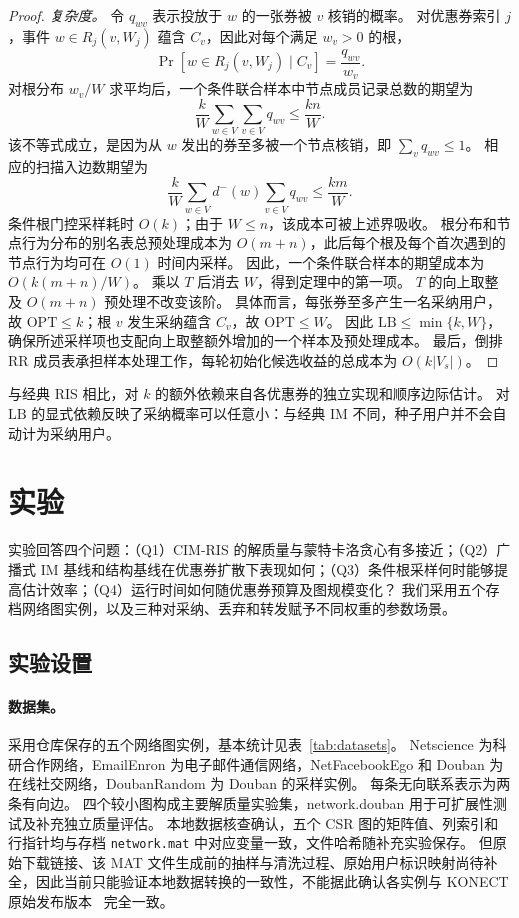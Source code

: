 \documentclass[sigconf,balance=false]{acmart}
\newcommand{\CIMRIS}{\textsc{CIM-RIS}}
\begin{document}
\begin{proof}
\textit{复杂度。}
令 $q_{wv}$ 表示投放于 $w$ 的一张券被 $v$ 核销的概率。
对优惠券索引 $j$，事件 $w\in R_j(v,W_j)$ 蕴含 $C_v$，因此对每个满足 $w_v>0$ 的根，
\[
  \Pr[w\in R_j(v,W_j)\mid C_v]=\frac{q_{wv}}{w_v}.
\]
对根分布 $w_v/W$ 求平均后，一个条件联合样本中节点成员记录总数的期望为
\[
  \frac{k}{W}\sum_{w\in V}\sum_{v\in V}q_{wv}
  \leq\frac{kn}{W}.
\]
该不等式成立，是因为从 $w$ 发出的券至多被一个节点核销，即 $\sum_vq_{wv}\leq1$。
相应的扫描入边数期望为
\[
  \frac{k}{W}\sum_{w\in V}d^-(w)\sum_{v\in V}q_{wv}
  \leq\frac{km}{W}.
\]
条件根门控采样耗时 $O(k)$；由于 $W\leq n$，该成本可被上述界吸收。
根分布和节点行为分布的别名表总预处理成本为 $O(m+n)$，此后每个根及每个首次遇到的节点行为均可在 $O(1)$ 时间内采样。
因此，一个条件联合样本的期望成本为 $O(k(m+n)/W)$。
乘以 $T$ 后消去 $W$，得到定理中的第一项。
$T$ 的向上取整及 $O(m+n)$ 预处理不改变该阶。
具体而言，每张券至多产生一名采纳用户，故 $\mathrm{OPT}\leq k$；根 $v$ 发生采纳蕴含 $C_v$，故 $\mathrm{OPT}\leq W$。
因此 $\mathrm{LB}\leq\min\{k,W\}$，确保所述采样项也支配向上取整额外增加的一个样本及预处理成本。
最后，倒排 RR 成员表承担样本处理工作，每轮初始化候选收益的总成本为 $O(k|V_s|)$。
\end{proof}

与经典 RIS 相比，对 $k$ 的额外依赖来自各优惠券的独立实现和顺序边际估计。
对 $\mathrm{LB}$ 的显式依赖反映了采纳概率可以任意小：与经典 IM 不同，种子用户并不会自动计为采纳用户。

\section{实验}
\label{sec:exp}

实验回答四个问题：（Q1）\CIMRIS{} 的解质量与蒙特卡洛贪心有多接近；（Q2）广播式 IM 基线和结构基线在优惠券扩散下表现如何；（Q3）条件根采样何时能够提高估计效率；（Q4）运行时间如何随优惠券预算及图规模变化？
我们采用五个存档网络图实例，以及三种对采纳、丢弃和转发赋予不同权重的参数场景。

\subsection{实验设置}
\label{sec:exp-setup}

\paragraph{数据集。}
采用仓库保存的五个网络图实例，基本统计见表~\ref{tab:datasets}。
Netscience 为科研合作网络，EmailEnron 为电子邮件通信网络，NetFacebookEgo 和 Douban 为在线社交网络，DoubanRandom 为 Douban 的采样实例。
每条无向联系表示为两条有向边。
四个较小图构成主要解质量实验集，network.douban 用于可扩展性测试及补充独立质量评估。
本地数据核查确认，五个 CSR 图的矩阵值、列索引和行指针均与存档 \texttt{network.mat} 中对应变量一致，文件哈希随补充实验保存。
但原始下载链接、该 MAT 文件生成前的抽样与清洗过程、原始用户标识映射尚待补全，因此当前只能验证本地数据转换的一致性，不能据此确认各实例与 KONECT 原始发布版本~\cite{kunegis2013konect} 完全一致。
\end{document}
